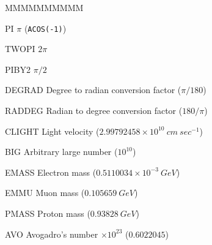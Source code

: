 \begin{DLtt}{MMMMMMMMMM}
\item[PI]         $\pi$ ({\tt ACOS(-1)})
\item[TWOPI]      $2\pi$
\item[PIBY2]      $\pi/2$
\item[DEGRAD]    Degree to radian conversion factor ($\pi/180$)
\item[RADDEG]    Radian to degree conversion factor ($180/\pi$)
\item[CLIGHT]    Light velocity ($2.99792458 \times 10^{10}
\: cm \: sec^{-1}$)
\item[BIG]       Arbitrary large number ($10^{10}$)
\item[EMASS]     Electron mass ($0.5110034 \times 10^{-3} \: GeV$)
\item[EMMU]      Muon mass ($0.105659 \: GeV$)
\item[PMASS]     Proton mass ($0.93828 \: GeV$)
\item[AVO]       Avogadro's number $\times 10^{23}$ ($0.6022045$)
\end{DLtt}
 
